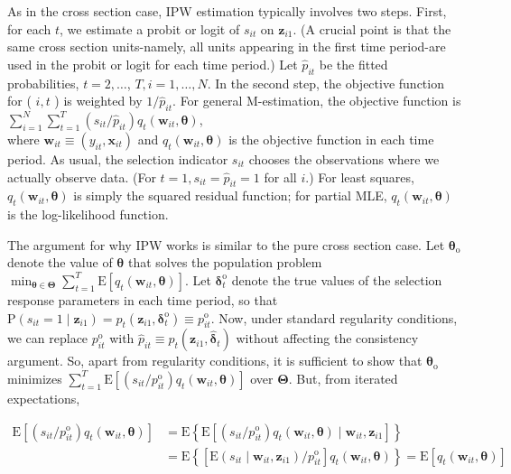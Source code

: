 \documentclass[10pt]{article}
\begin{document}
As in the cross section case, IPW estimation typically involves two steps. First, for each $t$, we estimate a probit or logit of $s_{i t}$ on $\mathbf{z}_{i 1}$. (A crucial point is that the same cross section units-namely, all units appearing in the first time period-are used in the probit or logit for each time period.) Let $\hat{p}_{i t}$ be the fitted probabilities, $t=2, \ldots$, $T, i=1, \ldots, N$. In the second step, the objective function for ( $i, t$ ) is weighted by $1 / \hat{p}_{i t}$. For general M-estimation, the objective function is\\
$\sum_{i=1}^{N} \sum_{t=1}^{T}\left(s_{i t} / \hat{p}_{i t}\right) q_{t}\left(\mathbf{w}_{i t}, \boldsymbol{\theta}\right)$,\\
where $\mathbf{w}_{i t} \equiv\left(y_{i t}, \mathbf{x}_{i t}\right)$ and $q_{t}\left(\mathbf{w}_{i t}, \boldsymbol{\theta}\right)$ is the objective function in each time period. As usual, the selection indicator $s_{i t}$ chooses the observations where we actually observe data. (For $t=1, s_{i t}=\hat{p}_{i t}=1$ for all $i$.) For least squares, $q_{t}\left(\mathbf{w}_{i t}, \boldsymbol{\theta}\right)$ is simply the squared residual function; for partial MLE, $q_{t}\left(\mathbf{w}_{i t}, \boldsymbol{\theta}\right)$ is the log-likelihood function.

The argument for why IPW works is similar to the pure cross section case. Let $\boldsymbol{\theta}_{\mathrm{o}}$ denote the value of $\boldsymbol{\theta}$ that solves the population problem $\min _{\boldsymbol{\theta} \in \boldsymbol{\Theta}} \sum_{t=1}^{T} \mathrm{E}\left[q_{t}\left(\mathbf{w}_{i t}, \boldsymbol{\theta}\right)\right]$. Let $\boldsymbol{\delta}_{t}^{\mathrm{o}}$ denote the true values of the selection response parameters in each time period, so that $\mathrm{P}\left(s_{i t}=1 \mid \mathbf{z}_{i 1}\right)=p_{t}\left(\mathbf{z}_{i 1}, \boldsymbol{\delta}_{t}^{\mathrm{o}}\right) \equiv p_{i t}^{\mathrm{o}}$. Now, under standard regularity conditions, we can replace $p_{i t}^{\mathrm{o}}$ with $\hat{p}_{i t} \equiv p_{t}\left(\mathbf{z}_{i 1}, \hat{\boldsymbol{\delta}}_{t}\right)$ without affecting the consistency argument. So, apart from regularity conditions, it is sufficient to show that $\boldsymbol{\theta}_{\mathrm{o}}$ minimizes $\sum_{t=1}^{T} \mathrm{E}\left[\left(s_{i t} / p_{i t}^{\mathrm{o}}\right) q_{t}\left(\mathbf{w}_{i t}, \boldsymbol{\theta}\right)\right]$ over $\boldsymbol{\Theta}$. But, from iterated expectations,

$$
\begin{aligned}
\mathrm{E}\left[\left(s_{i t} / p_{i t}^{\mathrm{o}}\right) q_{t}\left(\mathbf{w}_{i t}, \boldsymbol{\theta}\right)\right] & =\mathrm{E}\left\{\mathrm{E}\left[\left(s_{i t} / p_{i t}^{\mathrm{o}}\right) q_{t}\left(\mathbf{w}_{i t}, \boldsymbol{\theta}\right) \mid \mathbf{w}_{i t}, \mathbf{z}_{i 1}\right]\right\} \\
& =\mathrm{E}\left\{\left[\mathrm{E}\left(s_{i t} \mid \mathbf{w}_{i t}, \mathbf{z}_{i 1}\right) / p_{i t}^{\mathrm{o}}\right] q_{t}\left(\mathbf{w}_{i t}, \boldsymbol{\theta}\right)\right\}=\mathrm{E}\left[q_{t}\left(\mathbf{w}_{i t}, \boldsymbol{\theta}\right)\right]
\end{aligned}
$$
\end{document}
